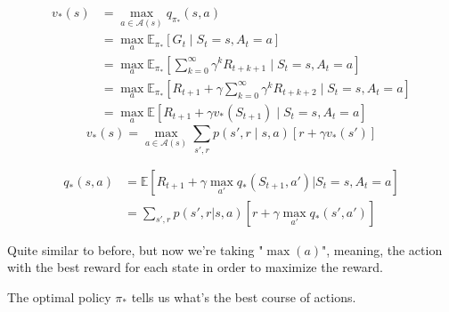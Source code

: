 \begin{align}
v_*(s) &= \max_{a \in \mathcal{A}(s)} q_{\pi_*}(s, a) \\
    &= \max_a \mathbb{E}_{\pi_*} [G_t \mid S_t = s, A_t = a] \\
    &= \max_a \mathbb{E}_{\pi_*} \left[ \sum_{k=0}^{\infty} \gamma^k R_{t+k+1} \mid S_t = s, A_t = a \right] \\
    &= \max_a \mathbb{E}_{\pi_*} \left[ R_{t+1} + \gamma \sum_{k=0}^{\infty} \gamma^k R_{t+k+2} \mid S_t = s, A_t = a \right] \\
    &= \max_a \mathbb{E} [R_{t+1} + \gamma v_*(S_{t+1}) \mid S_t = s, A_t = a]
\end{align}
\[
    v_*(s) = \max_{a \in \mathcal{A}(s)} \sum_{s',r} p(s', r \mid s, a) \left[ r + \gamma v_*(s') \right]
\]

\begin{align}
    q_*(s,a) &= \mathbb{E}[R_{t+1} + \gamma \max_{a'} q_*(S_{t+1},a') | S_t=s,A_t=a] \\
    &= \sum_{s',r} p(s',r | s,a) \left[ r + \gamma \max_{a'} q_*(s',a') \right]
\end{align}

Quite similar to before, but now we’re taking "$\max(a)$", meaning, the action with the best reward for each state in order to maximize the reward.

The optimal policy $\pi_*$ tells us what’s the best course of actions.






















































